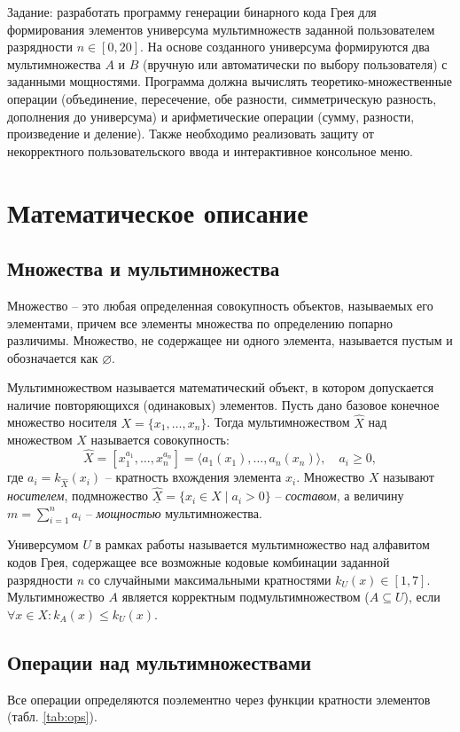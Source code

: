 \documentclass[14pt]{extreport}
\begin{document}
Задание: разработать программу генерации бинарного кода Грея для формирования элементов универсума мультимножеств заданной пользователем разрядности $n \in [0, 20]$. На основе созданного универсума формируются два мультимножества $A$ и $B$ (вручную или автоматически по выбору пользователя) с заданными мощностями. Программа должна вычислять теоретико-множественные операции (объединение, пересечение, обе разности, симметрическую разность, дополнения до универсума) и арифметические операции (сумму, разности, произведение и деление). Также необходимо реализовать защиту от некорректного пользовательского ввода и интерактивное консольное меню.

\newpage
{\centering\section{Математическое описание}}

{\subsection{Множества и мультимножества}}
Множество -- это любая определенная совокупность объектов, называемых его элементами, причем все элементы множества по определению попарно различимы. Множество, не содержащее ни одного элемента, называется пустым и обозначается как $\varnothing$.

Мультимножеством называется математический объект, в котором допускается наличие повторяющихся (одинаковых) элементов. Пусть дано базовое конечное множество носителя $X = \{x_1, \dots, x_n\}$. Тогда мультимножеством $\widehat{X}$ над множеством $X$ называется совокупность:
\[
    \widehat{X} = [x_1^{a_1}, \dots, x_n^{a_n}] = \langle a_1(x_1), \dots, a_n(x_n) \rangle, \quad a_i \geqslant 0,
\]
где $a_i = k_{\widehat{X}}(x_i)$ -- кратность вхождения элемента $x_i$. Множество $X$ называют \textit{носителем}, подмножество $\underline{\widehat{X}} = \{x_i \in X \mid a_i > 0\}$ -- \textit{составом}, а величину $m = \sum_{i=1}^n a_i$ -- \textit{мощностью} мультимножества.

Универсумом $U$ в рамках работы называется мультимножество над алфавитом кодов Грея, содержащее все возможные кодовые комбинации заданной разрядности $n$ со случайными максимальными кратностями $k_U(x) \in [1, 7]$. Мультимножество $A$ является корректным подмультимножеством ($A \subseteq U$), если $\forall x \in X: k_A(x) \leqslant k_U(x)$.

{\subsection{Операции над мультимножествами}}
Все операции определяются поэлементно через функции кратности элементов (табл. \ref{tab:ops}).
\end{document}

